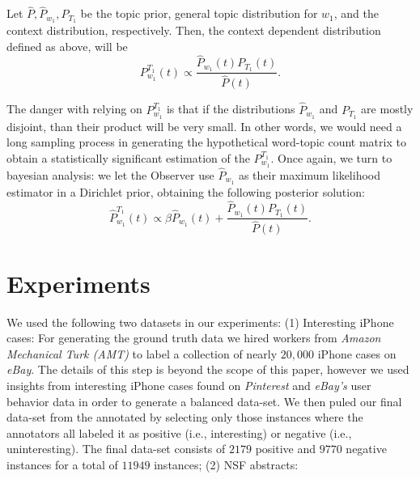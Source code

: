 \documentclass{article} %
\begin{document}
\bep
Let $\widehat{P},\widehat{P}_{w_1},P_{T_1}$ be the topic prior, general
topic distribution for $w_1$, and the context distribution,
respectively. Then, the context dependent distribution defined as
above, will be
\[P^{T_1}_{w_1}(t)\propto \frac{\widehat{P}_{w_1}\!(t)P_{T_1}\!(t)}{\widehat{P}(t)}.\]
\eep

The danger with relying on $P^{T_1}_{w_1}$
is that if the distributions $\widehat{P}_{w_1}$ and $P_{T_1}$ are
mostly disjoint, than their product will be very small. In other
words, we would need a long sampling process in generating the
hypothetical word-topic count matrix to obtain a statistically
significant estimation of the $P^{T_1}_{w_1}$. Once again,
we turn to bayesian analysis: we let the Observer use
$\widehat{P}_{w_1}$ as their maximum likelihood estimator in a
Dirichlet prior, obtaining the following posterior solution:
\[\widehat{P}^{T_1}_{w_1}(t)\propto \beta \widehat{P}_{w_1}\!(t) + \frac{\widehat{P}_{w_1}\!(t)P_{T_1}\!(t)}{\widehat{P}(t)}.\]



\section{Experiments}
\label{sec:experiments}
We used the following two datasets in our experiments: (1) Interesting iPhone cases:
For generating the ground truth data we hired workers from {\em Amazon Mechanical Turk (AMT)} to label a collection
of nearly $20,000$ iPhone cases on {\em eBay}. The details of this step is beyond the scope of this paper, however we used insights from
interesting iPhone cases found on {\em Pinterest} and {\em eBay's} user behavior data in order to generate a balanced data-set. 
We then puled our final data-set from the annotated by selecting only those instances where the annotators all labeled it as
positive (i.e., interesting) or negative (i.e., uninteresting). The final data-set consists of $2179$ positive and $9770$ negative instances for
a total of $11949$ instances; (2) NSF abstracts:
\end{document}
